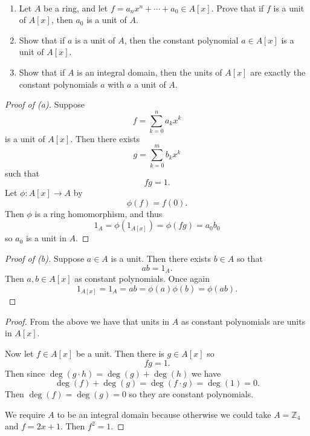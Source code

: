 \begin{prob}
    \ 
    \begin{enumerate}[label=(\alph*)]
        \item Let $A$ be a ring, and let 
            $f = a_nx^n + \cdots + a_0 \in A[x]$. Prove 
            that if $f$ is a unit of $A[x]$, then 
            $a_0$ is a unit of $A$.
        \item Show that if $a$ is a unit of $A$, then the 
            constant polynomial $a \in A[x]$ is a unit of 
            $A[x]$. 
        \item Show that if $A$ is an integral domain, 
            then the units of $A[x]$ are exactly the constant 
            polynomials $a$ with $a$ a unit of $A$. 
    \end{enumerate}
\end{prob}
\begin{proof}[Proof of (a)]
    Suppose 
    \[
        f = \sum_{k=0}^n a_kx^k
    \]
    is a unit of $A[x]$. Then there exists 
    \[
        g = \sum_{k=0}^m b_kx^k
    \]
    such that 
    \[
        fg = 1. 
    \]
    Let $\phi : A[x] \to A$ by 
    \[
        \phi(f) = f(0).
    \]
    Then $\phi$ is a ring homomorphism, and thus 
    \[
        1_A = \phi(1_{A[x]}) 
        = \phi(fg) = a_0 b_0 
    \]
    so $a_0$ is a unit in $A$. 
\end{proof}
\begin{proof}[Proof of (b)]
    Suppose $a \in A$ is a unit. Then there 
    exists $b \in A$ so that 
    \[
        ab = 1_A. 
    \]
    Then $a,b \in A[x]$ as constant polynomials. 
    Once again 
    \[
        1_{A[x]} = 1_A = 
        ab = \phi(a)\phi(b) 
        = \phi(ab). 
    \]
\end{proof}
\begin{proof}
    From the above we have that 
    units in $A$ as constant polynomials 
    are units in $A[x]$.  

    Now let $f \in A[x]$ be a unit. Then 
    there is $g \in A[x]$ so 
    \[
        fg = 1. 
    \]
    Then since $\deg(g\cdot h) = \deg(g) + \deg(h)$ we have 
    \[
        \deg(f) + \deg(g) = \deg(f\cdot g) = \deg(1) = 0. 
    \]
    Then $\deg(f) = \deg(g) = 0$ so they are constant polynomials. 

    We require $A$ to be an integral domain because otherwise 
    we could take $A = \mathbb Z_4$ and $f = 2x + 1$. 
    Then $f^2 = 1$. 
\end{proof}

